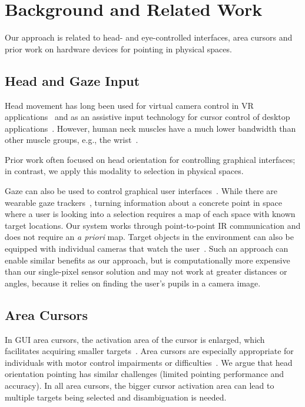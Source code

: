 \section{Background and Related Work}
Our approach is related to head- and eye-controlled interfaces, area cursors and prior work on hardware devices for pointing in physical spaces.

\subsection{Head and Gaze Input}
Head movement has long been used for virtual camera control in VR applications~\cite{pausch_user_1993} and as an assistive input technology for cursor control of desktop applications~\cite{radwin1990method}. However, human neck muscles have a much lower bandwidth than other muscle groups, e.g., the wrist~\cite{card_morphological_1991}.


Prior work often focused on head orientation for controlling graphical interfaces; in contrast, we apply this modality to selection in physical spaces.

Gaze can also be used to control graphical user interfaces~\cite{kumar2007eyepoint}. While there are wearable gaze trackers~\cite{bulling2009wearable}, turning information about a concrete point in space where a user is looking into a selection requires a map of each space with known target locations. Our system works through point-to-point IR communication and does not require an {\em a priori} map. Target objects in the environment can also be equipped with individual cameras that watch the user~\cite{smith2013gaze,vertegaal2005media}. Such an approach can enable similar benefits as our approach, but is computationally more expensive than our single-pixel sensor solution and may not work at greater distances or angles, because it relies on finding the user's pupils in a camera image.


\subsection{Area Cursors}
In GUI area cursors, the activation area of the cursor is enlarged, which facilitates acquiring smaller targets~\cite{kabbash1995prince}. Area cursors are especially appropriate for individuals with motor control impairments or difficulties~\cite{worden1997making,findlater2010enhanced}. We argue that head orientation pointing has similar challenges (limited pointing performance and accuracy). In all area cursors, the bigger cursor activation area can lead to multiple targets being selected and disambiguation is needed. 

